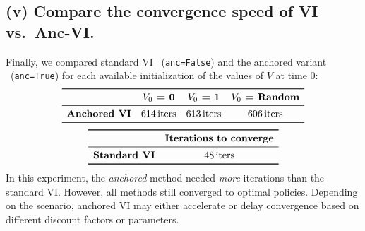 \subsection*{(v) Compare the convergence speed of VI vs.\ Anc-VI.}

\noindent
Finally, we compared standard VI \ (\texttt{anc=False}) and the anchored variant 
\ (\texttt{anc=True}) for each available initialization of the values of $V$ at time $0$:
\[
  \begin{array}{lccc}
  \toprule
    & \textbf{$V_0$ = 0} & \textbf{$V_0$ = 1} & \textbf{$V_0$ = Random} \\
  \midrule
  \textbf{Anchored VI} & 614\,\text{iters} & 613\,\text{iters} & 606\,\text{iters}\\
  \bottomrule
  \end{array}
\]
\[
  \begin{array}{lccc}
  \toprule
    & \textbf{Iterations to converge}\\
  \midrule
  \textbf{Standard VI} & 48\,\text{iters}\\
  \bottomrule
  \end{array}
\]
In this experiment, the \emph{anchored} method needed \emph{more} iterations 
than the standard VI.
However, all methods still converged to optimal policies. Depending on the scenario,
anchored VI may either accelerate or delay convergence based on different discount factors or parameters.